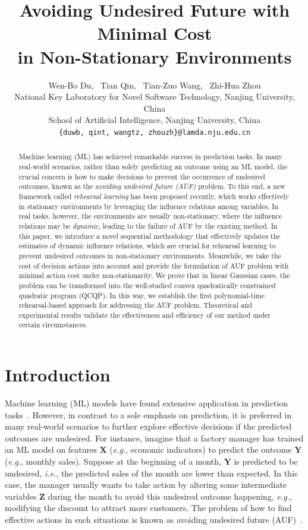 \documentclass{article}
\title{Avoiding Undesired Future with Minimal Cost\\
in Non-Stationary Environments}
\author{%
  Wen-Bo Du,~ Tian Qin,~ Tian-Zuo Wang,~ Zhi-Hua Zhou\\
National Key Laboratory for Novel Software Technology, Nanjing University, China\\
School of Artificial Intelligence, Nanjing University, China\\
  \texttt{\{duwb, qint, wangtz, zhouzh\}@lamda.nju.edu.cn} \\
}
\theoremstyle{plain}
\theoremstyle{definition}
\theoremstyle{remark}
\def \eg {\textit{e.g.}}
\def \ie {\textit{i.e.}}
\def \Z {\mathbf{Z}}
\def \X {\mathbf{X}}
\def \Y {\mathbf{Y}}
\begin{document}
\maketitle

\begin{abstract}
  \vskip -0.01in
  Machine learning (ML) has achieved remarkable success in prediction tasks. In many real-world scenarios, rather than solely predicting an outcome using an ML model, the crucial concern is how to make decisions to prevent the occurrence of undesired outcomes, known as the \emph{avoiding undesired future (AUF)} problem. To this end, a new framework called \emph{rehearsal learning} has been proposed recently, which works effectively in stationary environments by leveraging the influence relations among variables. In real tasks, however, the environments are usually non-stationary, 
  where the influence relations may be \emph{dynamic}, leading to the failure of AUF by the existing method.
  In this paper, we introduce a novel sequential methodology that effectively updates the estimates of dynamic influence relations, which are crucial for rehearsal learning to prevent undesired outcomes in non-stationary environments.
  Meanwhile, we take the cost of decision actions into account and provide the formulation of AUF problem with minimal action cost under non-stationarity. 
  We prove that in linear Gaussian cases, the problem can be transformed into the well-studied convex quadratically constrained quadratic program (QCQP). In this way, we establish the first polynomial-time rehearsal-based approach for addressing the AUF problem. 
  Theoretical and experimental results validate the effectiveness and efficiency of our method under certain circumstances.
\end{abstract}


\section{Introduction}
\label{sec:intro}
Machine learning (ML) models have found extensive application in prediction tasks~\citep{lecun2015deep}. 
However, in contrast to a sole emphasis on prediction, it is preferred in many real-world scenarios to further explore effective decisions if the predicted outcomes are undesired.
For instance, imagine that a factory manager has trained an ML model on features $\X$ (\eg, economic indicators) to predict the outcome $\Y$ (\eg, monthly sales). 
Suppose at the beginning of a month, $\Y$ is predicted to be undesired, \ie, the predicted sales of the month are lower than expected. 
In this case, the manager usually wants to take action by altering some intermediate variables $\Z$ during the month to avoid this undesired outcome happening, 
\eg, modifying the discount to attract more customers.  The problem of how to find effective actions in such situations is known as avoiding undesired future (AUF)~\citep{zhouzh2022rehearsal}.
\end{document}
